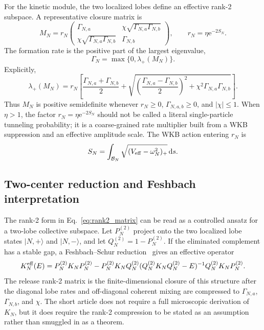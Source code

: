 \documentclass[11pt,a4paper]{article}
\newcommand{\dd}{\mathrm{d}}
\newcommand{\ee}{\mathrm{e}}
\begin{document}
For the kinetic module, the two localized lobes define an effective rank-2 subspace.
A representative closure matrix is
\begin{equation}
    M_N=r_N
    \begin{pmatrix}
        \Gamma_{N,a} & \chi\sqrt{\Gamma_{N,a}\Gamma_{N,b}}\\
        \chi\sqrt{\Gamma_{N,a}\Gamma_{N,b}} & \Gamma_{N,b}
    \end{pmatrix},
    \qquad r_N=\eta\ee^{-2S_N}.
    \label{eq:rank2_matrix}
\end{equation}
The formation rate is the positive part of the largest eigenvalue,
\begin{equation}
    \Gamma_N=\max\{0,\lambda_+(M_N)\}.
\end{equation}
Explicitly,
\begin{equation}
    \lambda_+(M_N)
    =
    r_N\left[
    \frac{\Gamma_{N,a}+\Gamma_{N,b}}{2}
    +
    \sqrt{
        \left(\frac{\Gamma_{N,a}-\Gamma_{N,b}}{2}\right)^2
        +
        \chi^2\Gamma_{N,a}\Gamma_{N,b}
    }
    \right].
    \label{eq:rank2_lamplus}
\end{equation}
Thus \(M_N\) is positive semidefinite whenever \(r_N\ge0\), \(\Gamma_{N,a,b}\ge0\), and \(|\chi|\le1\).
When \(\eta>1\), the factor \(r_N=\eta\ee^{-2S_N}\) should not be called a literal single-particle tunneling probability; it is a coarse-grained rate multiplier built from a WKB suppression and an effective amplitude scale.
The WKB action entering \(r_N\) is
\begin{equation}
    S_N=\int_{\mathcal B_N}\sqrt{(V_{\rm eff}-\omega_N^2)_+}\,\dd s.
    \label{eq:wkb_action}
\end{equation}

\subsection{Two-center reduction and Feshbach interpretation}

The rank-2 form in Eq.~\eqref{eq:rank2_matrix} can be read as a controlled ansatz for a two-lobe collective subspace.
Let \(P_N^{(2)}\) project onto the two localized lobe states \(|N,+\rangle\) and \(|N,-\rangle\), and let \(Q_N^{(2)}=1-P_N^{(2)}\).
If the eliminated complement has a stable gap, a Feshbach--Schur reduction~\cite{Feshbach1958} gives an effective operator
\begin{equation}
    K_N^{\rm eff}(E)
    =
    P_N^{(2)}K_NP_N^{(2)}
    -
    P_N^{(2)}K_NQ_N^{(2)}
    (Q_N^{(2)}K_NQ_N^{(2)}-E)^{-1}
    Q_N^{(2)}K_NP_N^{(2)}.
    \label{eq:feshbach_rank2}
\end{equation}
The release rank-2 matrix is the finite-dimensional closure of this structure after the diagonal lobe rates and off-diagonal coherent mixing are compressed to \(\Gamma_{N,a}\), \(\Gamma_{N,b}\), and \(\chi\).
The short article does not require a full microscopic derivation of \(K_N\), but it does require the rank-2 compression to be stated as an assumption rather than smuggled in as a theorem.
\end{document}
